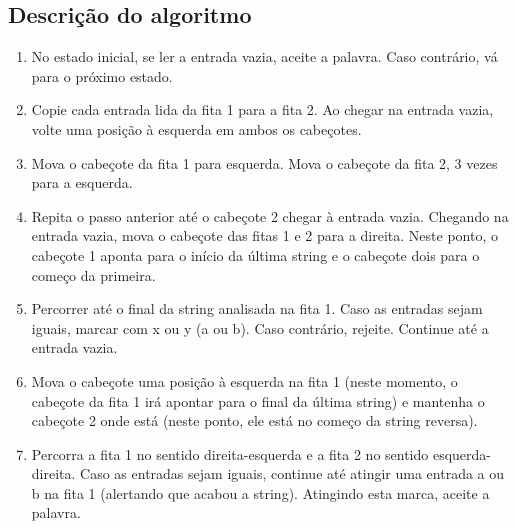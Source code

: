 \documentclass{article}
\begin{document}
    \subsection{Descrição do algoritmo}
        \begin{enumerate}
        \item No estado inicial, se ler a entrada vazia, aceite a palavra. Caso contrário, vá para o próximo estado.
        \item Copie cada entrada lida da fita 1 para a fita 2. Ao chegar na entrada vazia, volte uma posição à esquerda em ambos os cabeçotes.
        \item Mova o cabeçote da fita 1 para esquerda. Mova o cabeçote da fita 2, 3 vezes para a esquerda.
        \item Repita o passo anterior até o cabeçote 2 chegar à entrada vazia. Chegando na entrada vazia, mova o cabeçote das fitas 1 e 2 para a direita. Neste ponto, o cabeçote 1 aponta para o início da última string e o cabeçote dois para o começo da primeira.
        \item Percorrer até o final da string analisada na fita 1. Caso as entradas sejam iguais, marcar com x ou y (a ou b). Caso contrário, rejeite. Continue até a entrada vazia.
        \item Mova o cabeçote uma posição à esquerda na fita 1 (neste momento, o cabeçote da fita 1 irá apontar para o final da última string) e mantenha o cabeçote 2 onde está (neste ponto, ele está no começo da string reversa).
        \item Percorra a fita 1 no sentido direita-esquerda e a fita 2 no sentido esquerda-direita. Caso as entradas sejam iguais, continue até atingir uma entrada a ou b na fita 1 (alertando que acabou a string). Atingindo esta marca, aceite a palavra.
        \end{enumerate}
\end{document}
